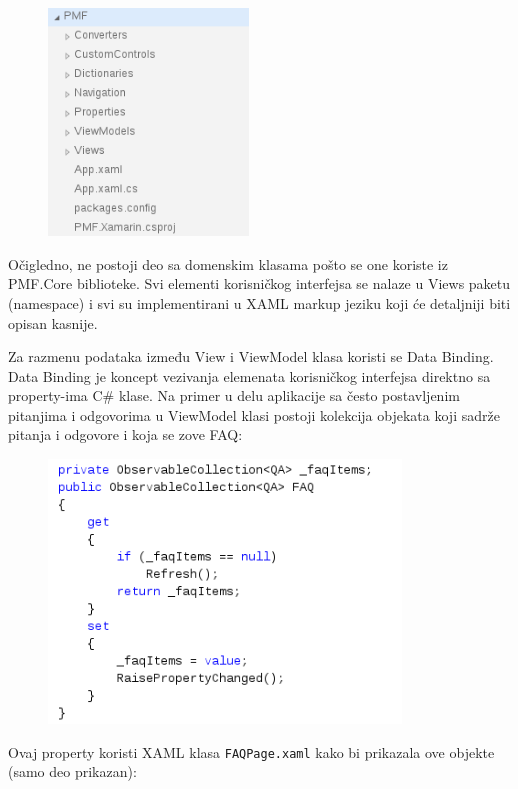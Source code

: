 \documentclass[a4paper]{article}
\begin{document}
\begin{figure}
\centering
\includegraphics[width=53.2mm,height=60.36mm]{msc-img37.png}
\end{figure}

\bigskip


\bigskip

Očigledno, ne postoji deo sa domenskim klasama pošto se one koriste iz
PMF.Core biblioteke. Svi elementi korisničkog interfejsa se nalaze u
Views paketu (namespace) i svi su implementirani u XAML markup jeziku
koji će detaljniji biti opisan kasnije.

Za razmenu podataka između View i ViewModel klasa koristi se Data
Binding. Data Binding je koncept vezivanja elemenata korisničkog
interfejsa direktno sa property-ima C\# klase. Na primer u delu
aplikacije sa često postavljenim pitanjima i odgovorima u ViewModel
klasi postoji kolekcija objekata koji sadrže pitanja i odgovore i koja
se zove FAQ:



\begin{figure}
\centering
\includegraphics[width=93.56mm,height=70.1mm]{msc-img38.png}
\end{figure}
Ovaj property koristi XAML klasa
\texttt{\textcolor[rgb]{0.0,0.4,0.8}{FAQPage.xaml}} kako bi prikazala
ove objekte (samo deo prikazan): 
\end{document}
